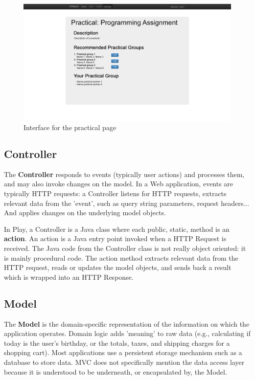 \begin{figure}[H]
    \centering
    \captionsetup{justification=centering}
    \includegraphics[width=\textwidth, frame]{images/mockup_practical}
    \caption{Interface for the practical page}
    \label{mockup_practical}
\end{figure}

\subsection{Controller}
The \textbf{Controller} responds to events (typically user actions) and processes them, and may also invoke changes on the model.
In a Web application, events are typically HTTP requests: a Controller listens for HTTP requests, extracts relevant data from the 'event', such as query string parameters, request headers... 
And applies changes on the underlying model objects.

In Play, a Controller is a Java class where each public, static, method is an \textbf{action}.
An action is a Java entry point invoked when a HTTP Request is received.
The Java code from the Controller class is not really object oriented: it is mainly procedural code.
The action method extracts relevant data from the HTTP request, reads or updates the model objects, and sends back a result which is wrapped into an HTTP Response.

\subsection{Model}
The \textbf{Model} is the domain-specific representation of the information on which the application operates.
Domain logic adds 'meaning' to raw data (e.g., calculating if today is the user's birthday, or the totals, taxes, and shipping charges for a shopping cart).
 Most applications use a persistent storage mechanism such as a database to store data.
MVC does not specifically mention the data access layer because it is understood to be underneath, or encapsulated by, the Model.

